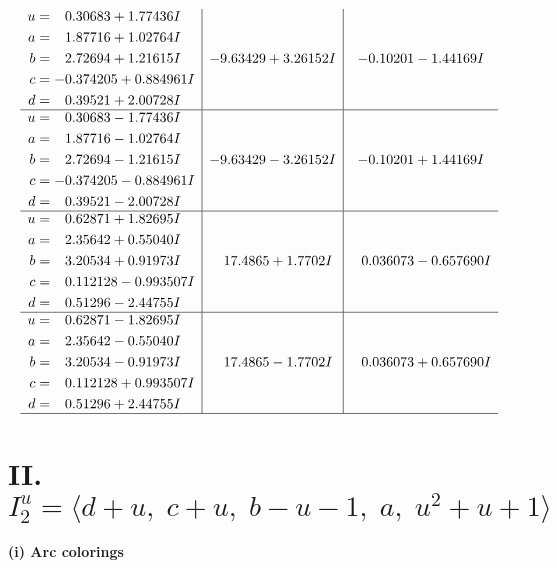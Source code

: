 \documentclass[1p]{elsarticle_modified}
\theoremstyle{definition}
\begin{document}
$$\begin{array}{c|c|c}
\begin{aligned}
u &= \phantom{-}0.30683 + 1.77436 I \\
a &= \phantom{-}1.87716 + 1.02764 I \\
b &= \phantom{-}2.72694 + 1.21615 I \\
c &= -0.374205 + 0.884961 I \\
d &= \phantom{-}0.39521 + 2.00728 I\end{aligned}
 & -9.63429 + 3.26152 I & -0.10201 - 1.44169 I \\ \hline\begin{aligned}
u &= \phantom{-}0.30683 - 1.77436 I \\
a &= \phantom{-}1.87716 - 1.02764 I \\
b &= \phantom{-}2.72694 - 1.21615 I \\
c &= -0.374205 - 0.884961 I \\
d &= \phantom{-}0.39521 - 2.00728 I\end{aligned}
 & -9.63429 - 3.26152 I & -0.10201 + 1.44169 I \\ \hline\begin{aligned}
u &= \phantom{-}0.62871 + 1.82695 I \\
a &= \phantom{-}2.35642 + 0.55040 I \\
b &= \phantom{-}3.20534 + 0.91973 I \\
c &= \phantom{-}0.112128 - 0.993507 I \\
d &= \phantom{-}0.51296 - 2.44755 I\end{aligned}
 & \phantom{-}17.4865 + 1.7702 I & \phantom{-}0.036073 - 0.657690 I \\ \hline\begin{aligned}
u &= \phantom{-}0.62871 - 1.82695 I \\
a &= \phantom{-}2.35642 - 0.55040 I \\
b &= \phantom{-}3.20534 - 0.91973 I \\
c &= \phantom{-}0.112128 + 0.993507 I \\
d &= \phantom{-}0.51296 + 2.44755 I\end{aligned}
 & \phantom{-}17.4865 - 1.7702 I & \phantom{-}0.036073 + 0.657690 I\\
 \hline 
 \end{array}$$\newpage\newpage\renewcommand{\arraystretch}{1}
\centering \section*{II. $I^u_{2}= \langle d+u,\;c+u,\;b- u-1,\;a,\;u^2+u+1 \rangle$}
\flushleft \textbf{(i) Arc colorings}\\
\end{document}
